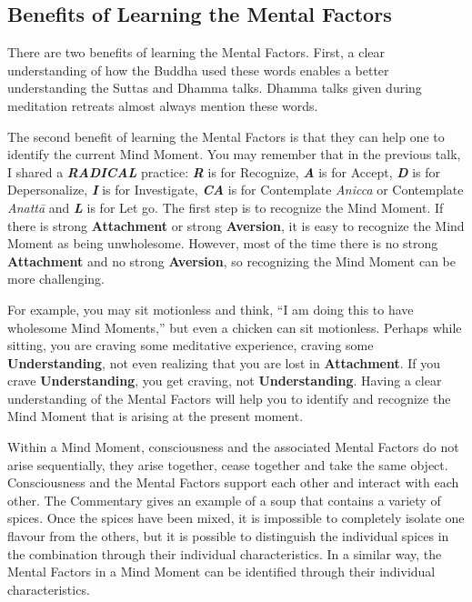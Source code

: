 \subsection*{Benefits of Learning the Mental Factors}

There are two benefits of learning the Mental Factors. First, a clear understanding of how the Buddha used these words enables a better understanding the Suttas and Dhamma talks. Dhamma talks given during meditation retreats almost always mention these words.

The second benefit of learning the Mental Factors is that they can help one to identify the current Mind Moment. You may remember that in the previous talk, I shared a \textbf{\textit{RADICAL}} \color{blue} practice\color{black}: \textbf{\textit{R}} is for Recognize, \textbf{\textit{A}} is for Accept, \textbf{\textit{D}} is for Depersonalize, \textbf{\textit{I}} is for Investigate, \textbf{\textit{CA}} is for Contemplate \textit{Anicca} or Contemplate \textit{Anattā} and \textit{\textbf{L}} is for Let go. The first step is to recognize the Mind Moment. If there is strong \textbf{Attachment} or strong \textbf{Aversion}, it is easy to recognize the Mind Moment as being unwholesome. However, most of the time there is no strong \textbf{Attachment} and no strong \textbf{Aversion}, so recognizing the Mind Moment can be more challenging.

For example, you may sit motionless and think, “I am doing this to have wholesome Mind Moments,” but even a chicken can sit motionless. Perhaps while sitting, you are craving some meditative experience, craving some \textbf{Understanding}, not even realizing that you are lost in \textbf{Attachment}. If you crave \textbf{Understanding}, you get craving, not \textbf{Understanding}. Having a clear understanding of the Mental Factors will help you to identify and recognize the Mind Moment that is arising at the present moment.

Within a Mind Moment, consciousness and the associated Mental Factors do not arise sequentially, they arise together, cease together and take the same object. Consciousness and the Mental Factors support each other and interact with each other. The Commentary gives an example of a soup that contains a variety of spices. Once the spices have been mixed, it is impossible to completely isolate one flavour from the others, but it is possible to distinguish the individual spices in the combination through their individual characteristics. In a similar way, the Mental Factors in a Mind Moment can be identified through their individual characteristics.

